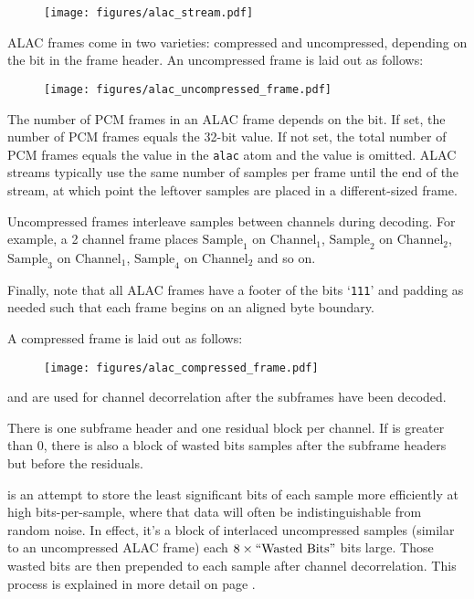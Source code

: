 \begin{figure}[h]
\texttt{[image: figures/alac\_stream.pdf]}
\end{figure}
\par
\noindent
ALAC frames come in two varieties: compressed and uncompressed,
depending on the  bit in the frame header.
An uncompressed frame is laid out as follows:
\label{alac_uncompressed}
\begin{figure}[h]
\texttt{[image: figures/alac\_uncompressed\_frame.pdf]}
\end{figure}
\par
\noindent
The number of PCM frames in an ALAC frame depends on the 
bit.
If set, the number of PCM frames equals the 32-bit 
value.
If not set, the total number of PCM frames equals the 
value in the \texttt{alac} atom and the  value is omitted.
ALAC streams typically use the same number of samples per frame
until the end of the stream, at which point the leftover samples
are placed in a different-sized frame.

Uncompressed frames interleave samples between channels during decoding.
For example, a 2 channel frame places $\text{Sample}_1$ on $\text{Channel}_1$,
$\text{Sample}_2$ on $\text{Channel}_2$,
$\text{Sample}_3$ on $\text{Channel}_1$,
$\text{Sample}_4$ on $\text{Channel}_2$ and so on.

Finally, note that all ALAC frames have a footer of the bits `\texttt{111}'
and padding as needed such that each frame begins on an aligned byte boundary.

\pagebreak

A compressed frame is laid out as follows:

\begin{figure}[h]
\texttt{[image: figures/alac\_compressed\_frame.pdf]}
\end{figure}
\par
\noindent
{} and  are used
for channel decorrelation after the subframes have been decoded.

There is one subframe header and one residual block per
channel.
If  is greater than 0, there is also
a block of wasted bits samples after the subframe headers but before
the residuals.

 is an attempt to store the least significant bits
of each sample more efficiently at high bits-per-sample, where
that data will often be indistinguishable from random noise.
In effect, it's a block of interlaced uncompressed samples
(similar to an uncompressed ALAC frame) each $8 \times \text{``{Wasted Bits}''}$
bits large.
Those wasted bits are then prepended to each sample after channel
decorrelation.
This process is explained in more detail on page \pageref{alac_wasted_bits}.

